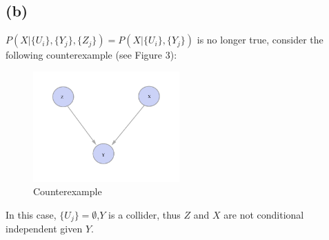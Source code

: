 \documentclass[12pt]{amsart}
\begin{document}
\subsection*{(b)}
$P(X|\{U_i\},\{Y_j\},\{Z_j\})=P(X|\{U_i\},\{Y_j\})$ is no longer true, consider the following
counterexample (see Figure 3):
\begin{figure}[h]
  \centering
  \includegraphics[width=0.5\textwidth]{ct_example.pdf}
  \caption{Counterexample}
\end{figure}

In this case, $\{U_j\}=\emptyset$,$Y$ is a collider, thus $Z$ and $X$ are not conditional independent given $Y$.
\end{document}
